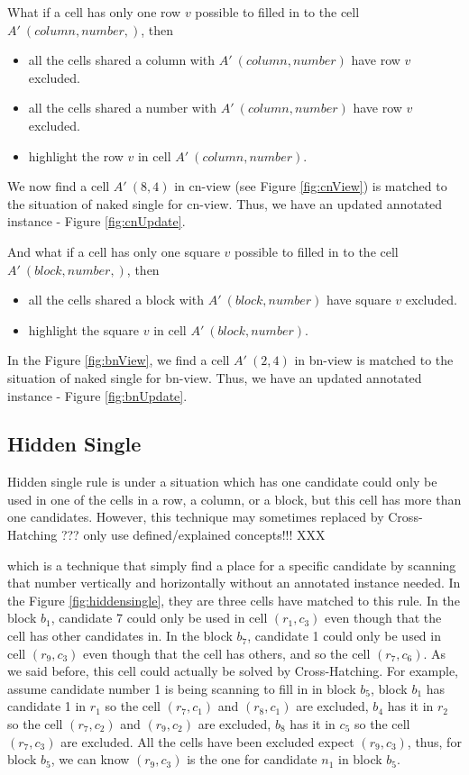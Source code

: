 \documentclass[11pt]{report}
\begin{document}
What if a cell has only one row $v$ possible to filled in to the cell $A'\ (column, number,)$, then

\begin{itemize}
\item all the cells shared a column with $A'\ (column, number)$ have row $v$ excluded.
\item all the cells shared a number with $A'\ (column, number)$ have row $v$ excluded.
\item highlight the row $v$ in cell $A'\ (column, number)$.
\end{itemize}
We now find a cell $A'\ (8, 4)$ in cn-view (see Figure \ref{fig:cnView}) is matched to the situation of naked single for cn-view. Thus, we have an updated annotated instance - Figure \ref{fig:cnUpdate}.

And what if a cell has only one square $v$ possible to filled in to the cell $A'\ (block, number,)$, then
\begin{itemize}
\item all the cells shared a block with $A'\ (block, number)$ have square $v$ excluded.
\item highlight the square $v$ in cell $A'\ (block, number)$.
\end{itemize}
In the Figure \ref{fig:bnView}, we find a cell $A'\ (2, 4)$ in bn-view is matched to the situation of naked single for bn-view. Thus, we have an updated annotated instance - Figure \ref{fig:bnUpdate}.


\subsection{Hidden Single}
\label{sec:Hidden Single}

Hidden single rule is under a situation which has one candidate could only be used in one of the cells in a row, a column, or a block, but this cell has more than one candidates. However, this technique may sometimes replaced by Cross-Hatching ??? only use defined/explained concepts!!! XXX

 which is a technique that simply find a place for a specific candidate by scanning that number vertically and horizontally without an annotated instance needed. In the Figure \ref{fig:hiddensingle}, they are three cells have matched to this rule. In the block $b_{1}$, candidate 7 could only be used in cell $(r_{1}, c_{3})$ even though that the cell has other candidates in. In the block $b_{7}$, candidate 1 could only be used in cell $(r_{9}, c_{3})$ even though that the cell has others, and so the cell $(r_{7}, c_{6})$. As we said before, this cell could actually be solved by Cross-Hatching. For example, assume candidate number 1 is being scanning to fill in in block $b_{5}$, block $b_{1}$ has candidate 1 in $r_{1}$ so the cell $(r_{7}, c_{1})$ and $(r_{8}, c_{1})$ are excluded, $b_{4}$ has it in $r_{2}$ so the cell $(r_{7}, c_{2})$ and $(r_{9}, c_{2})$ are excluded, $b_{8}$ has it in $c_{5}$ so the cell $(r_{7}, c_{3})$ are excluded. All the cells have been excluded expect $(r_{9}, c_{3})$, thus, for block $b_{5}$, we can know $(r_{9}, c_{3})$ is the one for candidate $n_{1}$ in block $b_{5}$.
\end{document}
